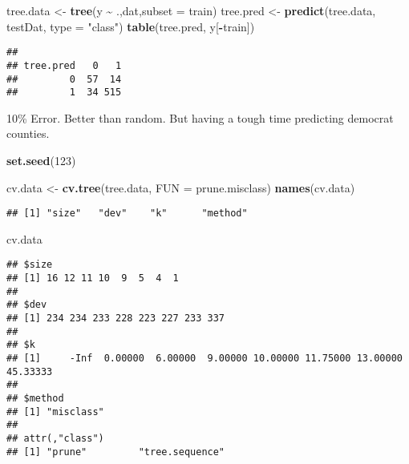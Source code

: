 \documentclass[
]{article}
\newenvironment{Shaded}{\begin{snugshade}}{\end{snugshade}}
\newcommand{\AttributeTok}[1]{\textcolor[rgb]{0.13,0.29,0.53}{#1}}
\newcommand{\DecValTok}[1]{\textcolor[rgb]{0.00,0.00,0.81}{#1}}
\newcommand{\FunctionTok}[1]{\textcolor[rgb]{0.13,0.29,0.53}{\textbf{#1}}}
\newcommand{\NormalTok}[1]{#1}
\newcommand{\OtherTok}[1]{\textcolor[rgb]{0.56,0.35,0.01}{#1}}
\newcommand{\SpecialCharTok}[1]{\textcolor[rgb]{0.81,0.36,0.00}{\textbf{#1}}}
\newcommand{\StringTok}[1]{\textcolor[rgb]{0.31,0.60,0.02}{#1}}
\begin{document}
\begin{Shaded}
\begin{Highlighting}[]
\NormalTok{tree.data }\OtherTok{\textless{}{-}} \FunctionTok{tree}\NormalTok{(y }\SpecialCharTok{\textasciitilde{}}\NormalTok{ .,dat,}\AttributeTok{subset =}\NormalTok{ train)}
\NormalTok{tree.pred }\OtherTok{\textless{}{-}} \FunctionTok{predict}\NormalTok{(tree.data, testDat, }\AttributeTok{type =} \StringTok{"class"}\NormalTok{)}
\FunctionTok{table}\NormalTok{(tree.pred, y[}\SpecialCharTok{{-}}\NormalTok{train])}
\end{Highlighting}
\end{Shaded}

\begin{verbatim}
##          
## tree.pred   0   1
##         0  57  14
##         1  34 515
\end{verbatim}

10\% Error. Better than random. But having a tough time predicting
democrat counties.

\begin{Shaded}
\begin{Highlighting}[]
\FunctionTok{set.seed}\NormalTok{(}\DecValTok{123}\NormalTok{)}

\NormalTok{cv.data }\OtherTok{\textless{}{-}} \FunctionTok{cv.tree}\NormalTok{(tree.data, }\AttributeTok{FUN =}\NormalTok{ prune.misclass)}
\FunctionTok{names}\NormalTok{(cv.data)}
\end{Highlighting}
\end{Shaded}

\begin{verbatim}
## [1] "size"   "dev"    "k"      "method"
\end{verbatim}

\begin{Shaded}
\begin{Highlighting}[]
\NormalTok{cv.data}
\end{Highlighting}
\end{Shaded}

\begin{verbatim}
## $size
## [1] 16 12 11 10  9  5  4  1
## 
## $dev
## [1] 234 234 233 228 223 227 233 337
## 
## $k
## [1]     -Inf  0.00000  6.00000  9.00000 10.00000 11.75000 13.00000 45.33333
## 
## $method
## [1] "misclass"
## 
## attr(,"class")
## [1] "prune"         "tree.sequence"
\end{verbatim}

\begin{Shaded}
\end{Shaded}
\end{document}
